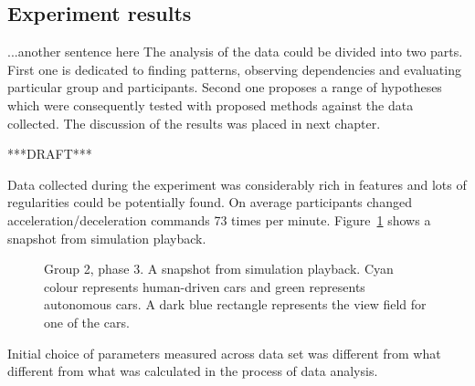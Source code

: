 \documentclass[11pt,english]{article}
\begin{document}
\subsection{Experiment results}

...another sentence here
The analysis of the data could be divided into two parts. First one is dedicated to finding patterns, observing dependencies and evaluating particular group and participants. Second one proposes a range of hypotheses which were consequently tested with proposed methods against the data collected. The discussion of the results was placed in next chapter.

***DRAFT***

Data collected during the experiment was considerably rich in features and lots of regularities could be potentially found. On average participants changed acceleration/deceleration commands 73 times per minute. 
Figure~\ref{fig:sample_snapshot} shows a snapshot from simulation playback.  
 
 
\begin{figure}[h] %
\caption{Group 2, phase 3. A snapshot from simulation playback. Cyan colour represents human-driven cars and green represents autonomous cars. A dark blue rectangle represents the view field for one of the cars.}
\label{fig:sample_snapshot}
\end{figure} 
 
Initial choice of parameters measured across data set was different from what different from what was calculated in the process of data analysis.
\end{document}
